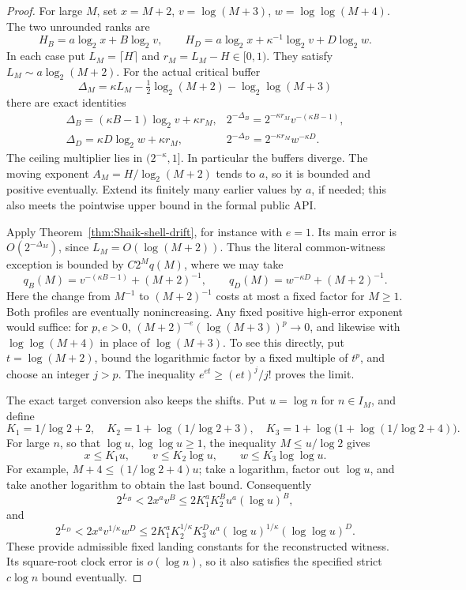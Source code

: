 \begin{proof}
For large \(M\), set \(x=M+2\), \(v=\log(M+3)\),
\(w=\log\log(M+4)\). The two unrounded ranks are
\[
 H_B=a\log_2x+B\log_2v,\qquad
 H_D=a\log_2x+\kappa^{-1}\log_2v+D\log_2w.
\]
In each case put \(L_M=\lceil H\rceil\) and \(r_M=L_M-H\in[0,1)\).
They satisfy \(L_M\sim a\log_2(M+2)\). For the actual critical buffer
\[
 \Delta_M=\kappa L_M-\tfrac12\log_2(M+2)-\log_2\log(M+3)
\]
there are exact identities
\begin{equation}\label{eq:Shaik-critical-cancellation}
 \begin{array}{ll}
 \Delta_B=(\kappa B-1)\log_2v+\kappa r_M,
 &2^{-\Delta_B}=2^{-\kappa r_M}v^{-(\kappa B-1)},\\[2pt]
 \Delta_D=\kappa D\log_2w+\kappa r_M,
 &2^{-\Delta_D}=2^{-\kappa r_M}w^{-\kappa D}.
 \end{array}
\end{equation}
The ceiling multiplier lies in \((2^{-\kappa},1]\).
In particular the buffers diverge. The moving exponent
\(A_M=H/\log_2(M+2)\) tends to \(a\), so it is bounded and positive
eventually. Extend its finitely many earlier values by \(a\), if needed;
this also meets the pointwise upper bound in the formal public API.

Apply Theorem~\ref{thm:Shaik-shell-drift}, for instance with \(e=1\).
Its main error is \(O(2^{-\Delta_M})\), since \(L_M=O(\log(M+2))\).
Thus the literal common-witness exception is bounded by \(C2^Mq(M)\),
where we may take
\[
 q_B(M)=v^{-(\kappa B-1)}+(M+2)^{-1},\qquad
 q_D(M)=w^{-\kappa D}+(M+2)^{-1}.
\]
Here the change from \(M^{-1}\) to \((M+2)^{-1}\) costs at most a
fixed factor for \(M\ge1\). Both profiles are eventually nonincreasing.
Any fixed positive high-error exponent would suffice: for \(p,e>0\),
\((M+2)^{-e}(\log(M+3))^p\to0\), and likewise with
\(\log\log(M+4)\) in place of \(\log(M+3)\).
To see this directly, put \(t=\log(M+2)\), bound the logarithmic
factor by a fixed multiple of \(t^p\), and choose an integer \(j>p\).
The inequality \(e^{et}\ge (et)^j/j!\) proves the limit.

The exact target conversion also keeps the shifts. Put \(u=\log n\)
for \(n\in I_M\), and define
\[
 K_1=1/\log2+2,\quad K_2=1+\log(1/\log2+3),\quad
 K_3=1+\log\bigl(1+\log(1/\log2+4)\bigr).
\]
For large \(n\), so that \(\log u,\log\log u\ge1\), the inequality
\(M\le u/\log2\) gives
\[
 x\le K_1u,\qquad v\le K_2\log u,\qquad
 w\le K_3\log\log u.
\]
For example, \(M+4\le(1/\log2+4)u\); take a logarithm, factor out
\(\log u\), and take another logarithm to obtain the last bound.
Consequently
\[
 2^{L_B}<2x^av^B
 \le2K_1^aK_2^B u^a(\log u)^B,
\]
and
\[
 2^{L_D}<2x^av^{1/\kappa}w^D
 \le2K_1^aK_2^{1/\kappa}K_3^D
                   u^a(\log u)^{1/\kappa}(\log\log u)^D.
\]
These provide admissible fixed landing constants for the reconstructed
witness. Its square-root clock error is \(o(\log n)\), so it also
satisfies the specified strict \(c\log n\) bound eventually.


\end{proof}
